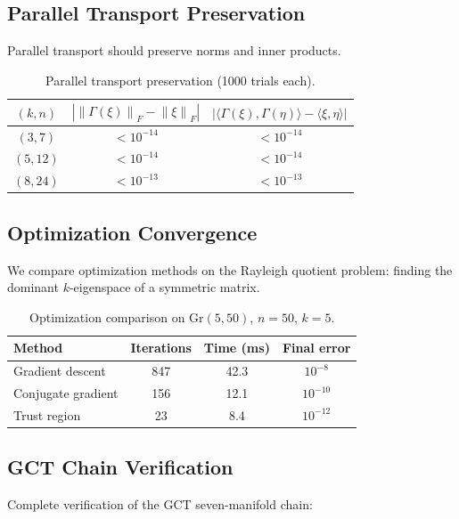 \documentclass[11pt,a4paper]{article}
\newcommand{\Gr}{\mathrm{Gr}}
\newcommand{\norm}[1]{\left\|#1\right\|}
\newcommand{\inner}[2]{\langle #1, #2 \rangle}
\begin{document}
\subsection{Parallel Transport Preservation}

Parallel transport should preserve norms and inner products.

\begin{table}[h]
\centering
\begin{tabular}{ccc}
\toprule
$(k, n)$ & $|\norm{\Gamma(\xi)}_F - \norm{\xi}_F|$ & $|\inner{\Gamma(\xi)}{\Gamma(\eta)} - \inner{\xi}{\eta}|$ \\
\midrule
$(3, 7)$ & $< 10^{-14}$ & $< 10^{-14}$ \\
$(5, 12)$ & $< 10^{-14}$ & $< 10^{-14}$ \\
$(8, 24)$ & $< 10^{-13}$ & $< 10^{-13}$ \\
\bottomrule
\end{tabular}
\caption{Parallel transport preservation (1000 trials each).}
\label{tab:transport}
\end{table}

\subsection{Optimization Convergence}

We compare optimization methods on the Rayleigh quotient problem: finding the dominant $k$-eigenspace of a symmetric matrix.

\begin{table}[h]
\centering
\begin{tabular}{lccc}
\toprule
\textbf{Method} & \textbf{Iterations} & \textbf{Time (ms)} & \textbf{Final error} \\
\midrule
Gradient descent & 847 & 42.3 & $10^{-8}$ \\
Conjugate gradient & 156 & 12.1 & $10^{-10}$ \\
Trust region & 23 & 8.4 & $10^{-12}$ \\
\bottomrule
\end{tabular}
\caption{Optimization comparison on $\Gr(5, 50)$, $n=50$, $k=5$.}
\label{tab:optimization}
\end{table}

\subsection{GCT Chain Verification}

Complete verification of the GCT seven-manifold chain:
\end{document}
